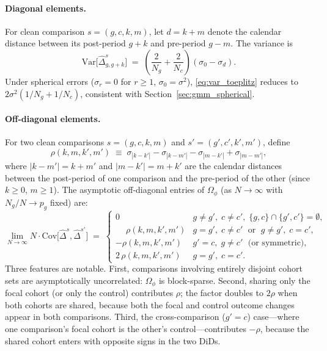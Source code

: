 \documentclass[12pt,letterpaper]{article}
\theoremstyle{remark}
\theoremstyle{definition}
\begin{document}
\paragraph{Diagonal elements.}
For clean comparison $s=(g,c,k,m)$, let $d=k+m$ denote the calendar
distance between its post-period $g+k$ and pre-period $g-m$. The variance
is
\begin{equation}
  \mathrm{Var}\!\bigl[\hat\Delta^{s}_{g,g+k}\bigr]
  \;=\;
  \left(\frac{2}{N_g}+\frac{2}{N_c}\right)(\sigma_0-\sigma_d).
  \label{eq:var_toeplitz}
\end{equation}
Under spherical errors ($\sigma_r=0$ for $r\geq1$, $\sigma_0=\sigma^2$),
\eqref{eq:var_toeplitz} reduces to $2\sigma^2(1/N_g+1/N_c)$, consistent
with Section~\ref{sec:gmm_spherical}.

\paragraph{Off-diagonal elements.}
For two clean comparisons $s=(g,c,k,m)$ and $s'=(g',c',k',m')$, define
\begin{equation}
  \rho(k,m,k',m')
  \;\equiv\;
  \sigma_{|k-k'|}-\sigma_{|k-m'|}-\sigma_{|m-k'|}+\sigma_{|m-m'|},
  \label{eq:rho}
\end{equation}
where $|k-m'|=k+m'$ and $|m-k'|=m+k'$ are the calendar distances between
the post-period of one comparison and the pre-period of the other
(since $k\geq0$, $m\geq1$). The asymptotic off-diagonal entries of
$\Omega_\phi$ (as $N\to\infty$ with $N_g/N\to p_g$ fixed) are:
\begin{equation}
  \lim_{N\to\infty}N\cdot\mathrm{Cov}\!\bigl[\hat\Delta^s,\hat\Delta^{s'}\bigr]
  \;=\;
  \begin{cases}
    0
    & g\neq g',\;c\neq c',\;\{g,c\}\cap\{g',c'\}=\emptyset,\\[6pt]
    \phantom{+}\rho(k,m,k',m')
    & g=g',\;c\neq c'\;\text{ or }\;g\neq g',\;c=c',\\[6pt]
    -\rho(k,m,k',m')
    & g'=c,\;g\neq c'\;\text{ (or symmetric)},\\[6pt]
    2\,\rho(k,m,k',m')
    & g=g',\;c=c'.
  \end{cases}
  \label{eq:cov_toeplitz}
\end{equation}
Three features are notable. First, comparisons involving entirely disjoint
cohort sets are asymptotically uncorrelated: $\Omega_\phi$ is block-sparse.
Second, sharing only the focal cohort (or only the control) contributes
$\rho$; the factor doubles to $2\rho$ when both cohorts are shared, because
both the focal and control outcome changes appear in both comparisons.
Third, the cross-comparison ($g'=c$) case---where one comparison's focal
cohort is the other's control---contributes $-\rho$, because the shared
cohort enters with opposite signs in the two DiDs.
\end{document}
